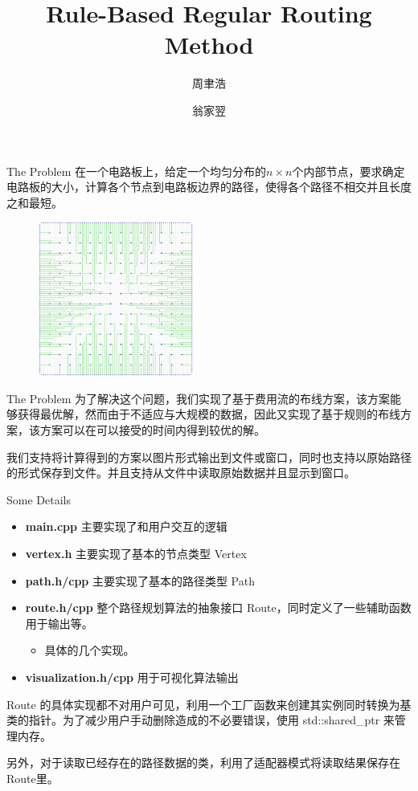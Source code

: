 \documentclass{beamer}
\title{Rule-Based Regular Routing Method}
\author{
	周聿浩 \and
	翁家翌
}
\begin{document}
\frame{\titlepage}
\begin{frame}{The Problem}
在一个电路板上，给定一个均匀分布的$n\times n$个内部节点，要求确定电路板的大小，计算各个节点到电路板边界的路径，使得各个路径不相交并且长度之和最短。

\begin{figure}[h]
	\centering
	\includegraphics[height=2in]{../project/testcase/small-cases/14x14-76x76.png}
\end{figure}

\end{frame}
\begin{frame}{The Problem}
为了解决这个问题，我们实现了基于费用流的布线方案，该方案能够获得最优解，然而由于不适应与大规模的数据，因此又实现了基于规则的布线方案，该方案可以在可以接受的时间内得到较优的解。

我们支持将计算得到的方案以图片形式输出到文件或窗口，同时也支持以原始路径的形式保存到文件。并且支持从文件中读取原始数据并且显示到窗口。

\end{frame}
\begin{frame}{Some Details}
\begin{itemize}
\item {\bf main.cpp} 主要实现了和用户交互的逻辑
\item {\bf vertex.h} 主要实现了基本的节点类型 Vertex
\item {\bf path.h/cpp} 主要实现了基本的路径类型 Path
\item {\bf route.h/cpp} 整个路径规划算法的抽象接口 Route，同时定义了一些辅助函数用于输出等。
\begin{itemize}
	\item 具体的几个实现。
\end{itemize}
\item {\bf visualization.h/cpp} 用于可视化算法输出
\end{itemize}

\pause
Route 的具体实现都不对用户可见，利用一个工厂函数来创建其实例同时转换为基类的指针。为了减少用户手动删除造成的不必要错误，使用 std::shared\_ptr 来管理内存。

另外，对于读取已经存在的路径数据的类，利用了适配器模式将读取结果保存在Route里。
\end{frame}
\end{document}
